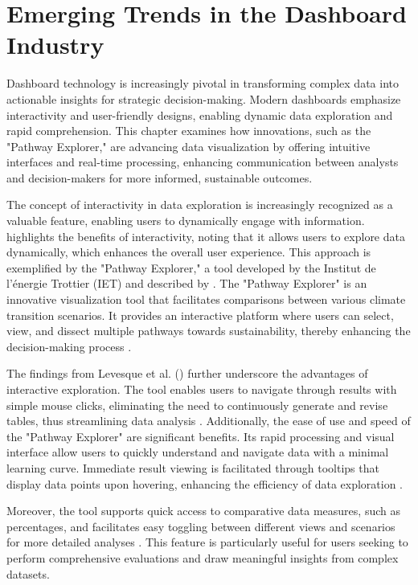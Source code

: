 \chapter{Emerging Trends in the Dashboard Industry}
Dashboard technology is increasingly pivotal 
in transforming complex data into actionable 
insights for strategic decision-making. 
Modern dashboards emphasize interactivity 
and user-friendly designs, enabling dynamic 
data exploration and rapid comprehension. 
This chapter examines how innovations, such 
as the "Pathway Explorer," are advancing 
data visualization by offering intuitive 
interfaces and real-time processing, enhancing 
communication between analysts and 
decision-makers for more informed, 
sustainable outcomes.

The concept of interactivity in data 
exploration is increasingly recognized 
as a valuable feature, enabling users to 
dynamically engage with information. 
\autocite[p.5]{hanumanthaiahAdvancementsDataVisualization2025} 
highlights the 
benefits of interactivity, noting that 
it allows users to explore data dynamically, 
which enhances the overall user experience. 
This approach is exemplified by the 
"Pathway Explorer," a tool developed by the 
Institut de l’énergie Trottier (IET) and 
described by \autocite{levesquePathwaysExplorerInteractive2024}. 
The "Pathway Explorer" is an innovative visualization 
tool that facilitates comparisons between various 
climate transition scenarios. It provides an 
interactive platform where users can select, 
view, and dissect multiple pathways towards 
sustainability, thereby enhancing the 
decision-making process \autocite[p.32]{levesquePathwaysExplorerInteractive2024}.

The findings from Levesque et al. (\citeyear{levesquePathwaysExplorerInteractive2024}) 
further underscore the advantages of interactive 
exploration. The tool enables users to navigate 
through results with simple mouse clicks, 
eliminating the need to continuously generate 
and revise tables, thus streamlining data 
analysis \autocite[p.32]{levesquePathwaysExplorerInteractive2024}. 
Additionally, the ease of use and speed of 
the "Pathway Explorer" are significant 
benefits. Its rapid processing and visual 
interface allow users to quickly understand 
and navigate data with a minimal learning 
curve. Immediate result viewing is facilitated 
through tooltips that display data points 
upon hovering, enhancing the efficiency of 
data exploration .

Moreover, the tool supports quick access 
to comparative data measures, such as percentages, 
and facilitates easy toggling between different 
views and scenarios for more detailed analyses \autocite[p.32]{levesquePathwaysExplorerInteractive2024}. 
This feature is particularly useful for users 
seeking to perform comprehensive evaluations 
and draw meaningful insights from complex 
datasets.

